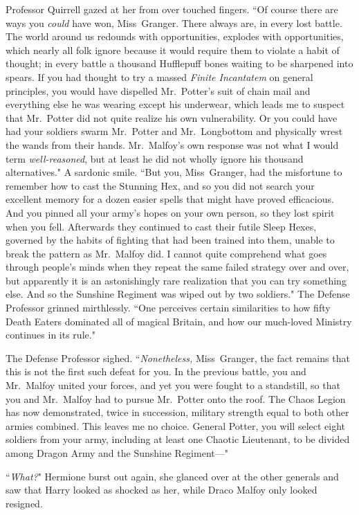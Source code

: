Professor Quirrell gazed at her from over touched fingers. ``Of course there are ways you \emph{could} have won, Miss~Granger. There always are, in every lost battle. The world around us redounds with opportunities, explodes with opportunities, which nearly all folk ignore because it would require them to violate a habit of thought; in every battle a thousand Hufflepuff bones waiting to be sharpened into spears. If you had thought to try a massed \emph{Finite Incantatem} on general principles, you would have dispelled Mr.~Potter's suit of chain mail and everything else he was wearing except his underwear, which leads me to suspect that Mr.~Potter did not quite realize his own vulnerability. Or you could have had your soldiers swarm Mr.~Potter and Mr.~Longbottom and physically wrest the wands from their hands. Mr.~Malfoy's own response was not what I would term \emph{well-reasoned}, but at least he did not wholly ignore his thousand alternatives." A sardonic smile. ``But you, Miss~Granger, had the misfortune to remember how to cast the Stunning Hex, and so you did not search your excellent memory for a dozen easier spells that might have proved efficacious. And you pinned all your army's hopes on your own person, so they lost spirit when you fell. Afterwards they continued to cast their futile Sleep Hexes, governed by the habits of fighting that had been trained into them, unable to break the pattern as Mr.~Malfoy did. I cannot quite comprehend what goes through people's minds when they repeat the same failed strategy over and over, but apparently it is an astonishingly rare realization that you can try something else. And so the Sunshine Regiment was wiped out by two soldiers." The Defense Professor grinned mirthlessly. ``One perceives certain similarities to how fifty Death Eaters dominated all of magical Britain, and how our much-loved Ministry continues in its rule."

The Defense Professor sighed. ``\emph{Nonetheless,} Miss~Granger, the fact remains that this is not the first such defeat for you. In the previous battle, you and Mr.~Malfoy united your forces, and yet you were fought to a standstill, so that you and Mr.~Malfoy had to pursue Mr.~Potter onto the roof. The Chaos Legion has now demonstrated, twice in succession, military strength equal to both other armies combined. This leaves me no choice. General Potter, you will select eight soldiers from your army, including at least one Chaotic Lieutenant, to be divided among Dragon Army and the Sunshine Regiment—"

``\emph{What?}" Hermione burst out again, she glanced over at the other generals and saw that Harry looked as shocked as her, while Draco Malfoy only looked resigned.


